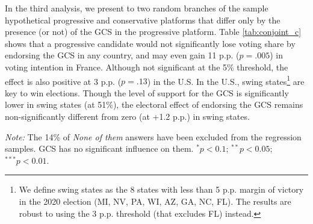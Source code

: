 In the third analysis, we present to two random branches of the sample hypothetical progressive and conservative platforms that differ only by the presence (or not) of the GCS in the progressive platform. Table \ref{tab:conjoint_c} shows that a progressive candidate would not significantly lose voting share by endorsing the GCS in any country, and may even gain 11 p.p. ($p = .005$) in voting intention in France. Although not significant at the 5\% threshold, the effect is also positive at 3 p.p. ($p = .13$) in the U.S. %
In the U.S., swing states\footnote{We define swing states as the 8 states with less than 5 p.p. margin of victory in the 2020 election (MI, NV, PA, WI, AZ, GA, NC, FL). The results are robust to using the 3 p.p. threshold (that excludes FL) instead.} are key to win elections. Though the level of support for the GCS is significantly lower in swing states (at 51\%), the electoral effect of endorsing the GCS remains non-significantly different from zero (at +1.2 p.p.) in swing states.


\begin{table}[h]
  \caption[Influence of the GCS on electoral prospects]{Preference for a progressive platform depending on whether it includes the GCS or not. (Question \ref{q:conjoint_c}) 
  } %
  \makebox[\textwidth][c]{}\label{tab:conjoint_c}
  {\footnotesize \textit{Note:} The 14\% of \textit{None of them} answers have been excluded from the regression samples. GCS has no significant influence on them. $^{*}p<0.1$; $^{**} p<0.05$; $^{***} p<0.01$. 
  }
\end{table}

